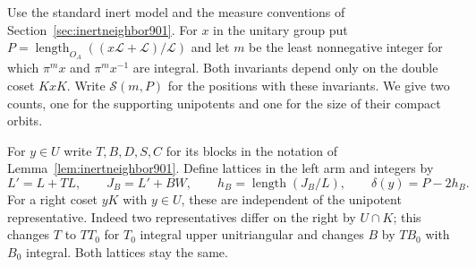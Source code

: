 \documentclass[a4paper,11pt]{article}
\theoremstyle{definition}
\theoremstyle{remark}
\numberwithin{equation}{section}
\begin{document}
Use the standard inert model and the measure conventions of
Section~\ref{sec:inertneighbor901}. For \(x\) in the unitary group
put \(P=\operatorname{length}_{O_A}((x\mathcal L+\mathcal L)/
\mathcal L)\) and let \(m\) be the least nonnegative integer
for which \(\pi^m x\) and \(\pi^m x^{-1}\) are integral.
Both invariants depend only on the double coset \(KxK\).
Write \(\mathcal S(m,P)\) for the positions with these invariants.
We give two counts, one for the supporting unipotents and one for
the size of their compact orbits.

For \(y\in U\) write \(T,B,D,S,C\) for its blocks in the notation
of Lemma~\ref{lem:inertneighbor901}. Define lattices in the left arm
and integers by
\[
  L'=L+T L,\qquad J_B=L'+BW,\qquad h_B=\operatorname{length}(J_B/L),
             \qquad \delta(y)=P-2h_B .
\]
For a right coset \(yK\) with \(y\in U\), these are independent
of the unipotent representative. Indeed two representatives
differ on the right by \(U\cap K\); this changes \(T\) to \(TT_0\)
for \(T_0\) integral upper unitriangular and changes \(B\) by
\(TB_0\) with \(B_0\) integral. Both lattices stay the same.
\end{document}
